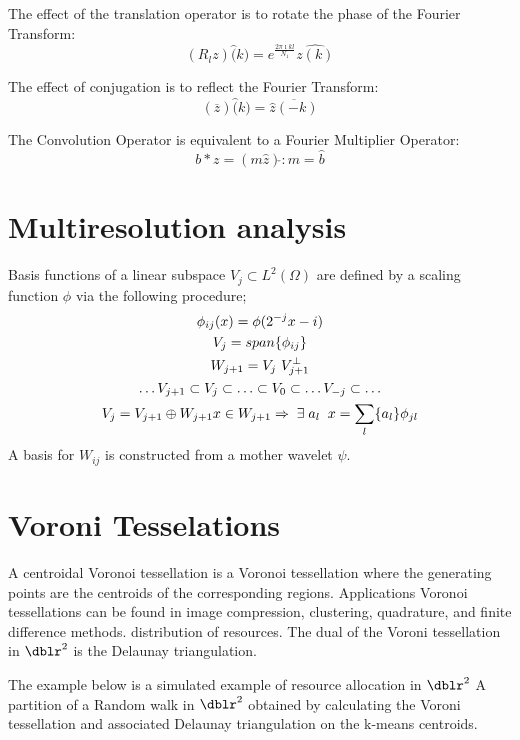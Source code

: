 The effect of the translation operator is to rotate the phase
of the Fourier Transform:
\begin{equation*}
(R_l z)\hat(k)=e^{ \frac{2 \pi \imath k l}{N_1}}\widehat{z(k)}
\end{equation*}

The effect of conjugation is to reflect the Fourier Transform:
\begin{equation*}
(\overline{z})\hat(k)=\overline{\hat z(-k)}
\end{equation*}


The Convolution Operator is equivalent to a Fourier Multiplier
Operator:
\begin{equation*}
b * z=(m \hat z )\check{} \! : m=\hat b
\end{equation*}

\section{Multiresolution analysis} Basis functions of a linear
subspace $V_j \subset L^2(\Omega)$ are
defined by a scaling function $\phi$ %
via the following procedure;
\begin{gather*}
\phi_{ij}(x) = \phi(2^{-j} x-i)  \\
V_j = span \{ \phi_{ij} \} \\
W_{j+1}= V_j \ V_{j+1}^\bot \\
\hdots V_{j+1} \subset V_j \subset \hdots \subset V_0 \subset \hdots V_{-j}  \subset \hdots \\
V_j=V_{j+1} \oplus W_{j+1} x \in W_{j+1} \Rightarrow \; \exists \;
{a_l} \;\; x=\sum_l \{a_l\} \phi_{jl}
\end{gather*}
A basis for $W_{ij}$ is constructed from a mother wavelet
$\psi$.

\section{Voroni Tesselations}
A centroidal Voronoi tessellation is a Voronoi tessellation where the
generating points are the centroids of the corresponding regions.
Applications Voronoi tessellations can be found in image compression,
clustering, quadrature, and finite difference methods. distribution of
resources.  The dual of the Voroni tessellation in $\dblr^2$ is the Delaunay
triangulation.

The example below is a simulated example of resource allocation in $\dblr^2$
A partition of a Random walk in $\dblr^2$ obtained by calculating the Voroni
tessellation and associated Delaunay triangulation on the k-means centroids.

